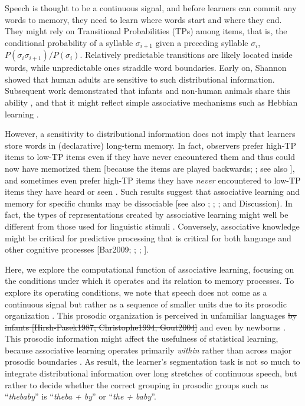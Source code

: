 \documentclass[
]{article}
\begin{document}
Speech is thought to be a continuous signal, and before learners can
commit any words to memory, they need to learn where words start and
where they end. They might rely on Transitional Probabilities (TPs)
among items, that is, the conditional probability of a syllable
\(\sigma_{i+1}\) given a preceding syllable \(\sigma_{i}\),
\(P(\sigma_{i}\sigma_{i+1})/P(\sigma_{i})\). Relatively predictable
transitions are likely located inside words, while unpredictable ones
straddle word boundaries. Early on, Shannon \citep{Shannon1951} showed
that human adults are sensitive to such distributional information.
Subsequent work demonstrated that infants and non-human animals share
this ability
\citep{Aslin1998, Chen2015, Fiser2002, Hauser2001, Saffran-Science, Toro2005-backward},
and that it might reflect simple associative mechanisms such as Hebbian
learning \citep{Goujon2015, Endress-TP-Model}.

However, a sensitivity to distributional information does not imply that
learners store words in (declarative) long-term memory. In fact,
observers prefer high-TP items to low-TP items even if they have never
encountered them and thus could now have memorized them {[}because the
items are played backwards; \citet{Turk-Browne-reversal}; see also
\citet{Jones2007}{]}, and sometimes even prefer high-TP items they have
\emph{never} encountered to low-TP items they have heard or seen
\citep{Endress-Phantoms-Vision}. Such results suggest that associative
learning and memory for specific chunks may be dissociable {[}see also
\citet{Cohen1980}; \citet{Knowlton1996a}; \citet{Poldrack2001};
\citet{Squire1992} and Discussion). In fact, the types of
representations created by associative learning might well be different
from those used for linguistic stimuli
\citep{Endress-Phantoms-Vision, Fischer-Baum2011}. Conversely,
associative knowledge might be critical for predictive processing
\citep{Sherman2020, Turk-Browne2010} that is critical for both language
\citep{Levy2008, Trueswell1999} and other cognitive processes
{[}Bar2009; \citet{Clark2013}; \citet{Friston2010};
\citet{Keller2018}{]}.

Here, we explore the computational function of associative learning,
focusing on the conditions under which it operates and its relation to
memory processes. To explore its operating conditions, we note that
speech does not come as a continuous signal but rather as a sequence of
smaller units due to its prosodic organization
\citep{Cutler1997, Nespor1986, Shattuck-Hufnagel1996}. This prosodic
organization is perceived in unfamiliar languages
\citep{Brentari2011, Endress-cross-seg, Fenlon2008, Pilon1981} \sout{by
infants {[}Hirsh-Pasek1987; Christophe1994; Gout2004{]}} and even by
newborns \citep{Christophe2001}. This prosodic information might affect
the usefulness of statistical learning, because associative learning
operates primarily \emph{within} rather than across major prosodic
boundaries \citep{Shukla2011}. As result, the learner's segmentation
task is not so much to integrate distributional information over long
stretches of continuous speech, but rather to decide whether the correct
grouping in prosodic groups such as ``\emph{thebaby}'' is ``\emph{theba
+ by}'' or ``\emph{the + baby}''.
\end{document}
